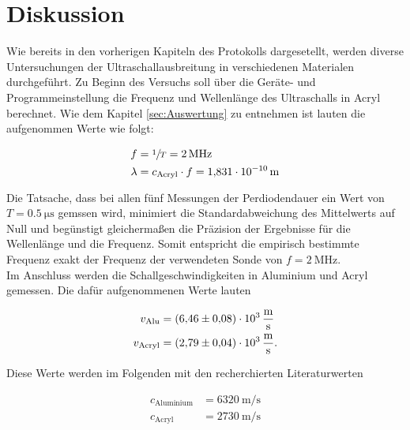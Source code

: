 %

%
\section{Diskussion}
\label{sec:Diskussion}

Wie bereits in den vorherigen Kapiteln des Protokolls dargesetellt, werden diverse Untersuchungen der Ultraschallausbreitung 
in verschiedenen Materialen durchgeführt. Zu Beginn des Versuchs soll über die Geräte- und Programmeinstellung die Frequenz 
und Wellenlänge des Ultraschalls in Acryl berechnet. Wie dem Kapitel \ref{sec:Auswertung} zu entnehmen ist lauten die 
aufgenommen Werte wie folgt:

\begin{align*}
    f &= \sfrac{1}{T} = \qty{2}{\mega\hertz}\\
    \lambda &= c_\text{Acryl}\cdot{}f = \qty{1.831e-10}{\meter}
\end{align*}

\noindent Die Tatsache, dass bei allen fünf Messungen der Perdiodendauer ein Wert von $T = \qty{0.5}{\micro\second}$ gemssen 
wird, minimiert die Standardabweichung des Mittelwerts auf Null und begünstigt gleichermaßen die Präzision der Ergebnisse 
für die Wellenlänge und die Frequenz. Somit entspricht die empirisch bestimmte Frequenz exakt der Frequenz der verwendeten 
Sonde von $f = \qty{2}{\mega\hertz}$.\\

\noindent Im Anschluss werden die Schallgeschwindigkeiten in Aluminium und Acryl gemessen. Die dafür aufgenommenen Werte lauten 

\begin{align*}
    v_\text{Alu} &= \qty{6.46\pm0.08e3}{\meter\per\second} \\
    v_\text{Acryl} &= \qty{2.79\pm0.04e3}{\meter \per \second}.
\end{align*}

\noindent Diese Werte werden im Folgenden mit den recherchierten Literaturwerten

\begin{align*}
    c_\text{Aluminium} &= \qty{6320}{\meter \per \second}\\
    c_\text{Acryl}  &= \qty{2730}{\meter \per \second}
\end{align*}

